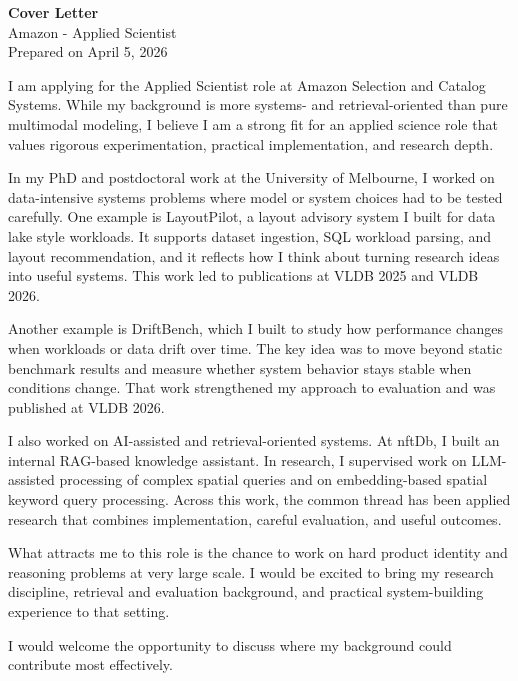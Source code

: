 \documentclass[11pt]{article}
\begin{document}
\thispagestyle{empty}
{\Large \textbf{Cover Letter}}\\
Amazon - Applied Scientist\\
Prepared on April 5, 2026

I am applying for the Applied Scientist role at Amazon Selection and Catalog Systems. While my background is more systems- and retrieval-oriented than pure multimodal modeling, I believe I am a strong fit for an applied science role that values rigorous experimentation, practical implementation, and research depth.

In my PhD and postdoctoral work at the University of Melbourne, I worked on data-intensive systems problems where model or system choices had to be tested carefully. One example is LayoutPilot, a layout advisory system I built for data lake style workloads. It supports dataset ingestion, SQL workload parsing, and layout recommendation, and it reflects how I think about turning research ideas into useful systems. This work led to publications at VLDB 2025 and VLDB 2026.

Another example is DriftBench, which I built to study how performance changes when workloads or data drift over time. The key idea was to move beyond static benchmark results and measure whether system behavior stays stable when conditions change. That work strengthened my approach to evaluation and was published at VLDB 2026.

I also worked on AI-assisted and retrieval-oriented systems. At nftDb, I built an internal RAG-based knowledge assistant. In research, I supervised work on LLM-assisted processing of complex spatial queries and on embedding-based spatial keyword query processing. Across this work, the common thread has been applied research that combines implementation, careful evaluation, and useful outcomes.

What attracts me to this role is the chance to work on hard product identity and reasoning problems at very large scale. I would be excited to bring my research discipline, retrieval and evaluation background, and practical system-building experience to that setting.

I would welcome the opportunity to discuss where my background could contribute most effectively.
\end{document}
